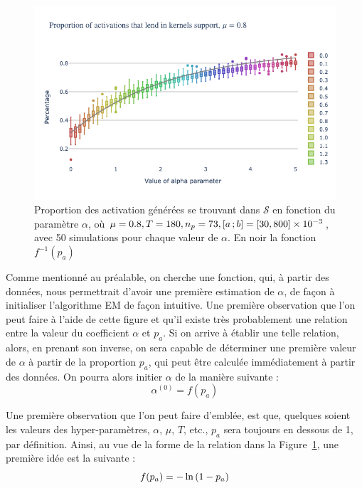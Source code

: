 \begin{figure}[h!]
    \centering
    \includegraphics[scale=0.6]{pics/ppt_in_support_transp.png}
    \caption{Proportion des activation générées se trouvant dans $\mathcal{S}$ en fonction du paramètre $\alpha$, où $\mu=0.8, T=180, n_p=73, \left[ a \, ; b \right]=\left\lbrack 30, 800 \right\rbrack \times \num{e-3}$, avec 50 simulations pour chaque valeur de $\alpha$. En noir la fonction $f^{-1}(p_a)$}
    \label{fig:ppt_in_support}
\end{figure}

Comme mentionné au préalable, on cherche une fonction, qui, à partir des données, nous permettrait d'avoir une première estimation de $\alpha$, de façon à initialiser l'algorithme EM de façon intuitive.
Une première observation que l'on peut faire à l'aide de cette figure et qu'il existe très probablement une relation entre la valeur du coefficient $\alpha$ et $p_a$.
Si on arrive à établir une telle relation, alors, en prenant son inverse, on sera capable de déterminer une première valeur de $\alpha$ à partir de la proportion $p_a$, qui peut être calculée immédiatement à partir des données.
On pourra alors initier $\alpha$ de la manière suivante :
\begin{equation}
    \alpha^{(0)} = f(p_a)
\end{equation}

Une première observation que l'on peut faire d'emblée, est que, quelques soient les valeurs des hyper-paramètres, $\alpha$, $\mu$, $T$, etc., $p_a$ sera toujours en dessous de 1, par définition.
Ainsi, au vue de la forme de la relation dans la Figure~\ref{fig:ppt_in_support}, une première idée est la suivante :
\begin{equation}\label{eq:alpha_init_1}
    f(p_a) = -\ln \left( 1-p_a \right)
\end{equation}


